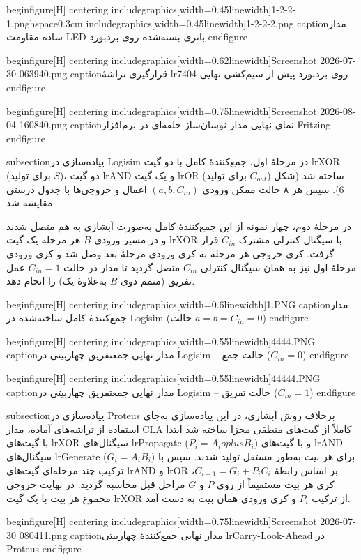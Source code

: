 begin{figure}[H]
centering
includegraphics[width=0.45linewidth]{1-2-2-1.png}hspace{0.3cm}
includegraphics[width=0.45linewidth]{1-2-2-2.png}
caption{مدار ساده مقاومت-LED-باتری بسته‌شده روی بردبورد}
end{figure}

begin{figure}[H]
centering
includegraphics[width=0.62linewidth]{{Screenshot 2026-07-30 063940}.png}
caption{قرارگیری تراشهٔ lr{7404} روی بردبورد پیش از سیم‌کشی نهایی}
end{figure}

begin{figure}[H]
centering
includegraphics[width=0.75linewidth]{{Screenshot 2026-08-04 160840}.png}
caption{نمای نهایی مدار نوسان‌ساز حلقه‌ای در نرم‌افزار Fritzing}
end{figure}

subsection{پیاده‌سازی در Logisim}
در مرحلهٔ اول، جمع‌کنندهٔ کامل با دو گیت lr{XOR} (برای تولید $S$)، دو گیت lr{AND} و یک گیت lr{OR} (برای تولید $C_{out}$) ساخته شد (شکل 6). سپس هر ۸ حالت ممکن ورودی $(a,b,C_{in})$ اعمال و خروجی‌ها با جدول درستی مقایسه شد.

در مرحلهٔ دوم، چهار نمونه از این جمع‌کنندهٔ کامل به‌صورت آبشاری به هم متصل شدند و در مسیر ورودی $B$ هر مرحله یک گیت lr{XOR} با سیگنال کنترلی مشترک $C_{in}$ قرار گرفت. کری خروجی هر مرحله به کری ورودی مرحلهٔ بعد وصل شد و کری ورودی مرحلهٔ اول نیز به همان سیگنال کنترلی $C_{in}$ متصل گردید تا مدار در حالت $C_{in}=1$ عمل تفریق (متمم دوی $B$ به‌علاوهٔ یک) را انجام دهد.

begin{figure}[H]
centering
includegraphics[width=0.6linewidth]{1.PNG}
caption{مدار جمع‌کنندهٔ کامل ساخته‌شده در Logisim (حالت $a=b=C_{in}=0$)}
end{figure}

begin{figure}[H]
centering
includegraphics[width=0.55linewidth]{4444.PNG}
caption{مدار نهایی جمعتفریق چهاربیتی در Logisim -- حالت جمع ($C_{in}=0$)}
end{figure}

begin{figure}[H]
centering
includegraphics[width=0.55linewidth]{44444.PNG}
caption{مدار نهایی جمعتفریق چهاربیتی در Logisim -- حالت تفریق ($C_{in}=1$)}
end{figure}

subsection{پیاده‌سازی در Proteus}
برخلاف روش آبشاری، در این پیاده‌سازی به‌جای استفاده از تراشه‌های آماده، مدار CLA کاملاً از گیت‌های منطقی مجزا ساخته شد ابتدا با گیت‌های lr{XOR} سیگنال‌های lr{Propagate} ($P_i=A_ioplus B_i$) و با گیت‌های lr{AND} سیگنال‌های lr{Generate} ($G_i=A_iB_i$) برای هر بیت به‌طور مستقل تولید شدند. سپس با ترکیب چند مرحله‌ای گیت‌های lr{AND} و lr{OR} بر اساس رابطهٔ $C_{i+1}=G_i+P_iC_i$، کری هر بیت مستقیماً از روی $P$ و $G$ مراحل قبل محاسبه گردید. در نهایت خروجی مجموع هر بیت با یک گیت lr{XOR} از ترکیب $P_i$ و کری ورودی همان بیت به دست آمد.

begin{figure}[H]
centering
includegraphics[width=0.75linewidth]{{Screenshot 2026-07-30 080411}.png}
caption{مدار نهایی جمع‌کنندهٔ چهاربیتی lr{Carry-Look-Ahead} در Proteus}
end{figure}


